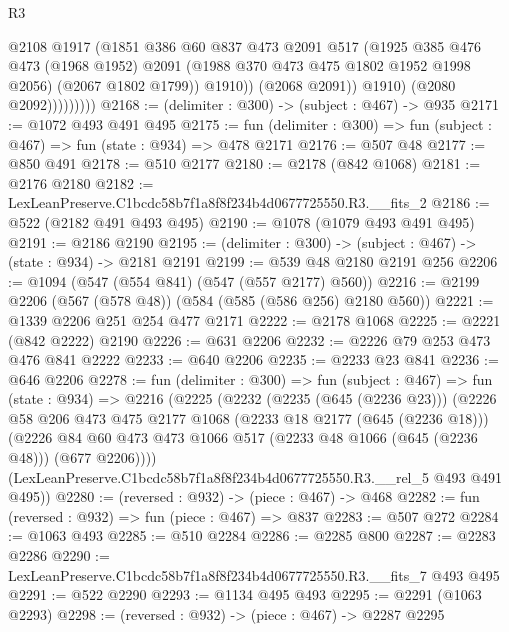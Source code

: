 \begin{lexlean}{R3}
\begin{coremodule}
                          @2108
                          @1917
                          (@1851
                            @386
                            @60
                            @837
                            @473
                            @2091
                            @517
                            (@1925
                              @385
                              @476
                              @473
                              (@1968 @1952)
                              @2091
                              (@1988 @370 @473 @475 @1802 @1952 @1998 @2056)
                              (@2067 @1802 @1799))
                            @1910))
                        (@2068 @2091))
                      @1910)
                    (@2080 @2092)))))))))
@2168 := (delimiter : @300) -> (subject : @467) -> @935
@2171 := @1072 @493 @491 @495
@2175 := fun (delimiter : @300) => fun (subject : @467) => fun (state : @934) => @478 @2171
@2176 := @507 @48
@2177 := @850 @491
@2178 := @510 @2177
@2180 := @2178 (@842 @1068)
@2181 := @2176 @2180
@2182 := LexLeanPreserve.C1bcdc58b7f1a8f8f234b4d0677725550.R3.__fits_2
@2186 := @522 (@2182 @491 @493 @495)
@2190 := @1078 (@1079 @493 @491 @495)
@2191 := @2186 @2190
@2195 := (delimiter : @300) -> (subject : @467) -> (state : @934) -> @2181 @2191
@2199 := @539 @48 @2180 @2191 @256
@2206 := @1094 (@547 (@554 @841) (@547 (@557 @2177) @560))
@2216 := @2199 @2206 (@567 (@578 @48)) (@584 (@585 (@586 @256) @2180 @560))
@2221 := @1339 @2206 @251 @254 @477 @2171
@2222 := @2178 @1068
@2225 := @2221 (@842 @2222) @2190
@2226 := @631 @2206
@2232 := @2226 @79 @253 @473 @476 @841 @2222
@2233 := @640 @2206
@2235 := @2233 @23 @841
@2236 := @646 @2206
@2278 := fun (delimiter : @300) =>
  fun (subject : @467) =>
  fun (state : @934) =>
  @2216
    (@2225
      (@2232
        (@2235 (@645 (@2236 @23)))
        (@2226
          @58
          @206
          @473
          @475
          @2177
          @1068
          (@2233 @18 @2177 (@645 (@2236 @18)))
          (@2226 @84 @60 @473 @473 @1066 @517 (@2233 @48 @1066 (@645 (@2236 @48))) (@677 @2206))))
      (LexLeanPreserve.C1bcdc58b7f1a8f8f234b4d0677725550.R3.__rel_5 @493 @491 @495))
@2280 := (reversed : @932) -> (piece : @467) -> @468
@2282 := fun (reversed : @932) => fun (piece : @467) => @837
@2283 := @507 @272
@2284 := @1063 @493
@2285 := @510 @2284
@2286 := @2285 @800
@2287 := @2283 @2286
@2290 := LexLeanPreserve.C1bcdc58b7f1a8f8f234b4d0677725550.R3.__fits_7 @493 @495
@2291 := @522 @2290
@2293 := @1134 @495 @493
@2295 := @2291 (@1063 @2293)
@2298 := (reversed : @932) -> (piece : @467) -> @2287 @2295

\end{coremodule}
\end{lexlean}
